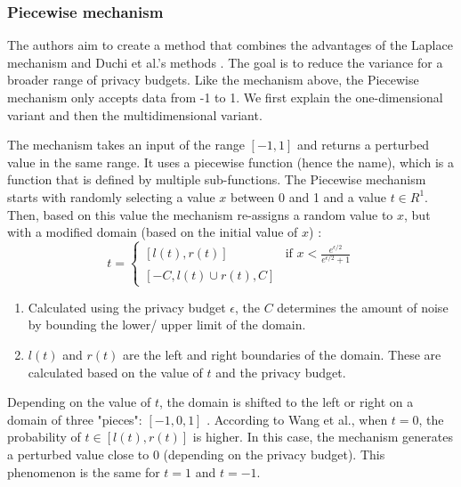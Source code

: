 \subsubsection*{Piecewise mechanism} \label{theory:piecewise}
The authors aim to create a method that combines the advantages of the Laplace mechanism and Duchi et al.'s methods \citep{wang_collecting_2019}.
The goal is to reduce the variance for a broader range of privacy budgets.
Like the mechanism above, the Piecewise mechanism only accepts data from -1 to 1.
We first explain the one-dimensional variant and then the multidimensional variant. \newpage

The mechanism takes an input of the range $[-1, 1]$ and returns a perturbed value in the same range.
It uses a piecewise function (hence the name), which is a function that is defined by multiple sub-functions.
The Piecewise mechanism starts with randomly selecting a value $x$ between 0 and 1 and a value $t \in R^1$.
Then, based on this value the mechanism re-assigns a random value to $x$, but with a modified domain (based on the initial value of $x$) \citep{wang_collecting_2019}:
\begin{equation} \label{eq:piecewise-domain}
  t = \begin{cases}
    [l(t), r(t)] & \text{if } x < \frac{e^{\epsilon/2}}{e^{\epsilon/2}+1} \\
    [-C, l(t) \cup r(t), C]
  \end{cases}
\end{equation}
\begin{enumerate}
  \item Calculated using the privacy budget $\epsilon$, the $C$ determines the amount of noise by bounding the lower/ upper limit of the domain.
  \item $l(t)$ and $r(t)$ are the left and right boundaries of the domain. These are calculated based on the value of $t$ and the privacy budget.
\end{enumerate}
Depending on the value of $t$, the domain is shifted to the left or right on a domain of three "pieces": $[-1, 0, 1]$ \citep{wang_collecting_2019}.
According to Wang et al., when $t = 0$, the probability of $t \in [l(t), r(t)]$ is higher.
In this case, the mechanism generates a perturbed value close to $0$ (depending on the privacy budget).
This phenomenon is the same for $t = 1$ and $t = -1$. \newline

